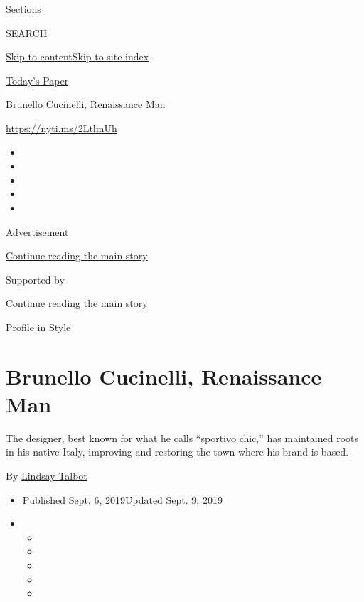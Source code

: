 Sections

SEARCH

\protect\hyperlink{site-content}{Skip to
content}\protect\hyperlink{site-index}{Skip to site index}

\href{https://myaccount.nytimes.com/auth/login?response_type=cookie\&client_id=vi}{}

\href{https://www.nytimes.com/section/todayspaper}{Today's Paper}

Brunello Cucinelli, Renaissance Man

\href{https://nyti.ms/2LtlmUh}{https://nyti.ms/2LtlmUh}

\begin{itemize}
\item
\item
\item
\item
\item
\end{itemize}

Advertisement

\protect\hyperlink{after-top}{Continue reading the main story}

Supported by

\protect\hyperlink{after-sponsor}{Continue reading the main story}

Profile in Style

\hypertarget{brunello-cucinelli-renaissance-man}{%
\section{Brunello Cucinelli, Renaissance
Man}\label{brunello-cucinelli-renaissance-man}}

The designer, best known for what he calls ``sportivo chic,'' has
maintained roots in his native Italy, improving and restoring the town
where his brand is based.

By \href{https://www.nytimes.com/by/lindsay-talbot}{Lindsay Talbot}

\begin{itemize}
\item
  Published Sept. 6, 2019Updated Sept. 9, 2019
\item
  \begin{itemize}
  \item
  \item
  \item
  \item
  \item
  \end{itemize}
\end{itemize}

